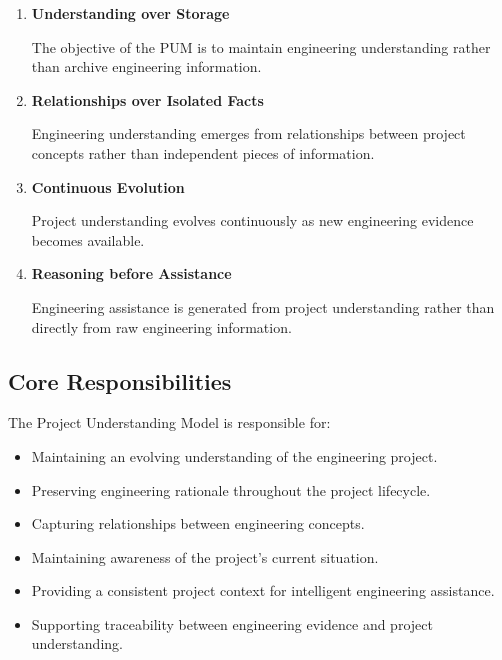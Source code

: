 \begin{enumerate}

\item \textbf{Understanding over Storage}

The objective of the PUM is to maintain engineering understanding rather than archive engineering information.

\item \textbf{Relationships over Isolated Facts}

Engineering understanding emerges from relationships between project concepts rather than independent pieces of information.

\item \textbf{Continuous Evolution}

Project understanding evolves continuously as new engineering evidence becomes available.

\item \textbf{Reasoning before Assistance}

Engineering assistance is generated from project understanding rather than directly from raw engineering information.

\end{enumerate}


\subsection{Core Responsibilities}

The Project Understanding Model is responsible for:

\begin{itemize}

\item Maintaining an evolving understanding of the engineering project.

\item Preserving engineering rationale throughout the project lifecycle.

\item Capturing relationships between engineering concepts.

\item Maintaining awareness of the project's current situation.

\item Providing a consistent project context for intelligent engineering assistance.

\item Supporting traceability between engineering evidence and project understanding.

\end{itemize}


